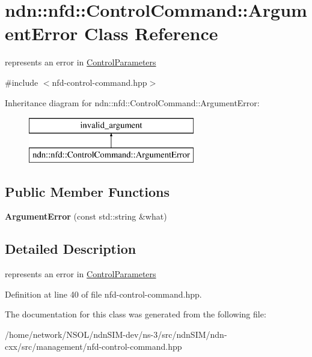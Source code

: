 \hypertarget{classndn_1_1nfd_1_1ControlCommand_1_1ArgumentError}{}\section{ndn\+:\+:nfd\+:\+:Control\+Command\+:\+:Argument\+Error Class Reference}
\label{classndn_1_1nfd_1_1ControlCommand_1_1ArgumentError}


represents an error in \hyperlink{classndn_1_1nfd_1_1ControlParameters}{Control\+Parameters}  




{\ttfamily \#include $<$nfd-\/control-\/command.\+hpp$>$}

Inheritance diagram for ndn\+:\+:nfd\+:\+:Control\+Command\+:\+:Argument\+Error\+:\begin{figure}[H]
\begin{center}
\leavevmode
\includegraphics[height=2.000000cm]{classndn_1_1nfd_1_1ControlCommand_1_1ArgumentError}
\end{center}
\end{figure}
\subsection*{Public Member Functions}
\begin{DoxyCompactItemize}
\item 
{\bfseries Argument\+Error} (const std\+::string \&what)\hypertarget{classndn_1_1nfd_1_1ControlCommand_1_1ArgumentError_a42cd4a540890741d8301f4a18510721d}{}\label{classndn_1_1nfd_1_1ControlCommand_1_1ArgumentError_a42cd4a540890741d8301f4a18510721d}

\end{DoxyCompactItemize}


\subsection{Detailed Description}
represents an error in \hyperlink{classndn_1_1nfd_1_1ControlParameters}{Control\+Parameters} 

Definition at line 40 of file nfd-\/control-\/command.\+hpp.



The documentation for this class was generated from the following file\+:\begin{DoxyCompactItemize}
\item 
/home/network/\+N\+S\+O\+L/ndn\+S\+I\+M-\/dev/ns-\/3/src/ndn\+S\+I\+M/ndn-\/cxx/src/management/nfd-\/control-\/command.\+hpp\end{DoxyCompactItemize}
